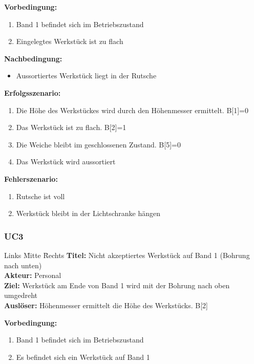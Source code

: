 \documentclass[oneside,a4paper,titlepage]{scrartcl}              %
\begin{document}
\textbf{Vorbedingung:}
\begin{enumerate}
  \item Band 1 befindet sich im Betriebszustand
  \item Eingelegtes Werkstück ist zu flach
\end{enumerate}

\textbf{Nachbedingung:}
\begin{itemize}
  \item Aussortiertes Werkstück liegt in der Rutsche
\end{itemize}

\textbf{Erfolgsszenario:}
\begin{enumerate}
  \item Die Höhe des Werkstückes wird durch den Höhenmesser ermittelt. B[1]=0
  \item Das Werkstück ist zu flach. B[2]=1
  \item Die Weiche bleibt im geschlossenen Zustand. B[5]=0
  \item Das Werkstück wird aussortiert
\end{enumerate}

\textbf{Fehlerszenario:}
\begin{enumerate}
  \item Rutsche ist voll
  \item Werkstück bleibt in der Lichtschranke hängen
\end{enumerate}

\newpage

\subsubsection{UC3}
\begin{tabbing}
  Links \= Mitte \= Rechts \kill
  \textbf{Titel:}    \> \> Nicht akzeptiertes Werkstück auf Band 1 (Bohrung nach unten)\\
  \textbf{Akteur:}   \> \> Personal\\
  \textbf{Ziel:}     \> \> Werkstück am Ende von Band 1 wird mit der Bohrung nach oben umgedreht\\
  \textbf{Auslöser:} \> \> Höhenmesser ermittelt die Höhe des Werkstücks. B[2]\\
\end{tabbing}

\textbf{Vorbedingung:}
\begin{enumerate}
  \item Band 1 befindet sich im Betriebszustand
  \item Es befindet sich ein Werkstück auf Band 1
\end{enumerate}
\end{document}
